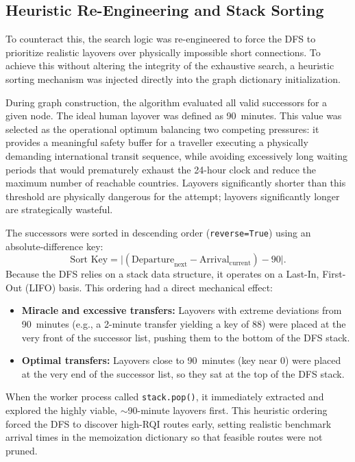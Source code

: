 \subsection{Heuristic Re-Engineering and Stack Sorting}
\label{subsec:heuristic_re_engineering}

To counteract this, the search logic was re-engineered to force the DFS to prioritize realistic layovers over physically impossible short connections. To achieve this without altering the integrity of the exhaustive search, a heuristic sorting mechanism was injected directly into the graph dictionary initialization.

\medskip

During graph construction, the algorithm evaluated all valid successors for a given node. The ideal human layover was defined as 90~minutes. This value was selected as the operational optimum balancing two competing pressures: it provides a meaningful safety buffer for a traveller executing a physically demanding international transit sequence, while avoiding excessively long waiting periods that would prematurely exhaust the 24-hour clock and reduce the maximum number of reachable countries. Layovers significantly shorter than this threshold are physically dangerous for the attempt; layovers significantly longer are strategically wasteful. 

\medskip

The successors were sorted in descending order (\texttt{reverse=True}) using an absolute-difference key:
\begin{equation}
\text{Sort Key} = \bigl|(\mathrm{Departure}_{\text{next}} - \mathrm{Arrival}_{\text{current}}) - 90\bigr|.
\end{equation}
Because the DFS relies on a stack data structure, it operates on a Last-In, First-Out (LIFO) basis. This ordering had a direct mechanical effect:
\begin{itemize}
    \item \textbf{Miracle and excessive transfers:} Layovers with extreme deviations from 90~minutes (e.g., a 2-minute transfer yielding a key of 88) were placed at the very front of the successor list, pushing them to the bottom of the DFS stack.
    \item \textbf{Optimal transfers:} Layovers close to 90~minutes (key near $0$) were placed at the very end of the successor list, so they sat at the top of the DFS stack.
\end{itemize}
When the worker process called \texttt{stack.pop()}, it immediately extracted and explored the highly viable, $\sim$90-minute layovers first. This heuristic ordering forced the DFS to discover high-RQI routes early, setting realistic benchmark arrival times in the memoization dictionary so that feasible routes were not pruned.

